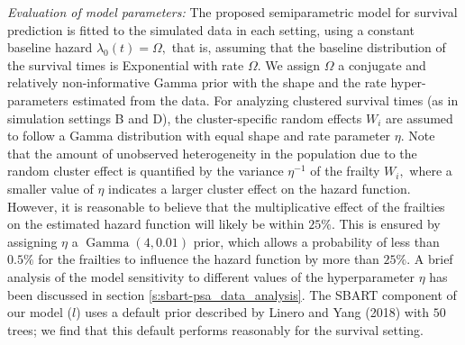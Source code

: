 \documentclass[11pt]{article}
\newcommand{\Gam}{\operatorname{Gamma}}
\begin{document}
 \textit{Evaluation of model parameters:} The proposed semiparametric model for survival prediction is fitted to the simulated data in each setting, using a constant baseline hazard $\lambda_0(t) = \Omega,$ that is, assuming that the baseline distribution of the survival times is Exponential with rate $\Omega.$ We assign $\Omega$ a conjugate and relatively non-informative Gamma prior with the shape and the rate hyper-parameters estimated from the data. For analyzing clustered survival times (as in simulation settings B and D), the cluster-specific random effects $W_i$ are assumed to follow a Gamma distribution with equal shape and rate parameter $\eta.$ Note that the amount of unobserved heterogeneity in the population due to the random cluster effect is quantified by the variance $\eta^{-1}$ of the frailty $W_i,$ where a smaller value of $\eta$ indicates a larger cluster effect on the hazard function. However, it is reasonable to believe that the multiplicative effect of the frailties on the estimated hazard function will likely be within $25\%.$ This is ensured by assigning $\eta$ a $\Gam(4, 0.01)$ prior, which allows a probability of less than $0.5\%$ for the frailties to influence the hazard function by more than $25\%.$ A brief analysis of the model sensitivity to different values of the hyperparameter $\eta$ has been discussed in section \ref{s:sbart-psa_data_analysis}. The SBART component of our model ($l$) uses a default prior described by Linero and Yang (2018) with $50$ trees; we find that this default performs reasonably for the survival setting.

\color{red}
\end{document}
